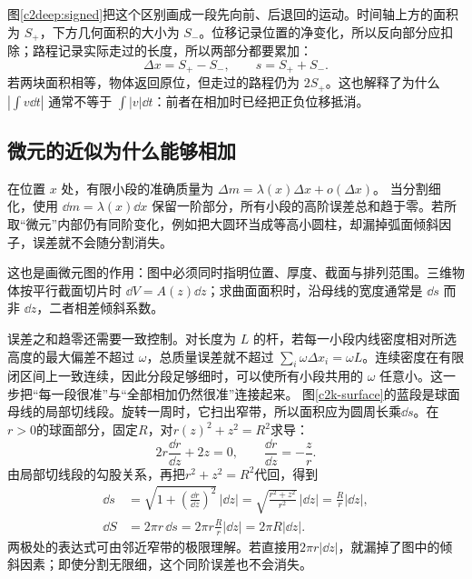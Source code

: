 图\ref{c2deep:signed}把这个区别画成一段先向前、后退回的运动。时间轴上方的面积为 $S_+$，下方几何面积的大小为 $S_-$。位移记录位置的净变化，所以反向部分应扣除；路程记录实际走过的长度，所以两部分都要累加：
\[
 \Delta x=S_+-S_-,\qquad s=S_++S_-.
\]
若两块面积相等，物体返回原位，但走过的路程仍为 $2S_+$。这也解释了为什么 $|\int v\dd t|$ 通常不等于 $\int|v|\dd t$：前者在相加时已经把正负位移抵消。


\subsection{微元的近似为什么能够相加}
在位置 $x$ 处，有限小段的准确质量为
$\Delta m=\lambda(x)\Delta x+o(\Delta x)$。
当分割细化，使用 $\dd m=\lambda(x)\dd x$ 保留一阶部分，所有小段的高阶误差总和趋于零。若所取“微元”内部仍有同阶变化，例如把大圆环当成等高小圆柱，却漏掉弧面倾斜因子，误差就不会随分割消失。

这也是画微元图的作用：图中必须同时指明位置、厚度、截面与排列范围。三维物体按平行截面切片时 $\dd V=A(z)\dd z$；求曲面面积时，沿母线的宽度通常是 $\dd s$ 而非 $\dd z$，二者相差倾斜系数。

误差之和趋零还需要一致控制。对长度为 $L$ 的杆，若每一小段内线密度相对所选高度的最大偏差不超过 $\omega$，总质量误差就不超过 $\sum_i\omega\Delta x_i=\omega L$。连续密度在有限闭区间上一致连续，因此分段足够细时，可以使所有小段共用的 $\omega$ 任意小。这一步把“每一段很准”与“全部相加仍然很准”连接起来。
图\ref{c2k-surface}的蓝段是球面母线的局部切线段。旋转一周时，它扫出窄带，所以面积应为圆周长乘$\dd s$。在$r>0$的球面部分，固定$R$，对$r(z)^2+z^2=R^2$求导：
\[
2r\frac{\dd r}{\dd z}+2z=0,
\qquad \frac{\dd r}{\dd z}=-\frac zr.
\]
由局部切线段的勾股关系，再把$r^2+z^2=R^2$代回，得到
\begin{align*}
\dd s&=\sqrt{1+\left(\frac{\dd r}{\dd z}\right)^2}\,|\dd z|
=\sqrt{\frac{r^2+z^2}{r^2}}\,|\dd z|
=\frac Rr|\dd z|,\\
\dd S&=2\pi r\,\dd s=2\pi r\frac Rr|\dd z|=2\pi R|\dd z|.
\end{align*}
两极处的表达式可由邻近窄带的极限理解。若直接用$2\pi r|\dd z|$，就漏掉了图中的倾斜因素；即使分割无限细，这个同阶误差也不会消失。

